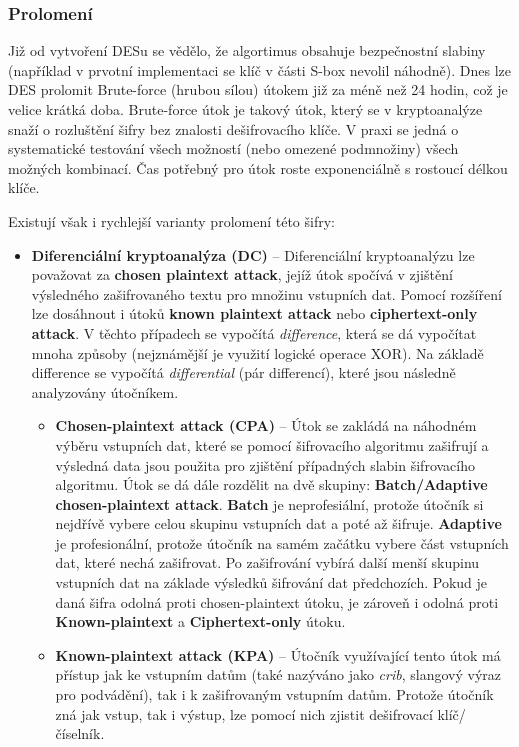 \documentclass[12pt, a4paper]{article}
\begin{document}
		\subsubsection{Prolomení}
		Již od vytvoření DESu se vědělo, že algortimus obsahuje bezpečnostní slabiny (například v prvotní implementaci se klíč v části S-box nevolil náhodně). Dnes lze DES prolomit Brute-force (hrubou sílou) útokem již za méně než 24 hodin, což je velice krátká doba. Brute-force útok je takový útok, který se v kryptoanalýze snaží o rozluštění šifry bez znalosti dešifrovacího klíče. V praxi se jedná o systematické testování všech možností (nebo omezené podmnožiny) všech možných kombinací. Čas potřebný pro útok roste exponenciálně s rostoucí délkou klíče.
		\par
		Existují však i rychlejší varianty prolomení této šifry:
		\begin{itemize}
			\item \textbf{Diferenciální kryptoanalýza (DC)} -- Diferenciální kryptoanalýzu lze považovat za \textbf{chosen plaintext attack}, jejíž útok spočívá v zjištění výsledného zašifrovaného textu pro množinu vstupních dat. Pomocí rozšíření lze dosáhnout i útoků \textbf{known plaintext attack} nebo \textbf{ciphertext-only attack}. V těchto případech se vypočítá \textit{difference}, která se dá vypočítat mnoha způsoby (nejznámější je využití logické operace XOR). Na základě difference se vypočítá \textit{differential} (pár differencí), které jsou následně analyzovány útočníkem.
			\begin{itemize}	
				\item \textbf{Chosen-plaintext attack (CPA)} -- Útok se zakládá na náhodném výběru vstupních dat, které se pomocí šifrovacího algoritmu zašifrují a výsledná data jsou použita pro zjištění případných slabin šifrovacího algoritmu. Útok se dá dále rozdělit na dvě skupiny: \textbf{Batch/Adaptive chosen-plaintext attack}. \textbf{Batch} je neprofesiální, protože útočník si nejdřívě vybere celou skupinu vstupních dat a poté až šifruje. \textbf{Adaptive} je profesionální, protože útočník na samém začátku vybere část vstupních dat, které nechá zašifrovat. Po zašifrování vybírá další menší skupinu vstupních dat na základe výsledků šifrování dat předchozích. Pokud je daná šifra odolná proti chosen-plaintext útoku, je zároveň i odolná proti \textbf{Known-plaintext} a \textbf{Ciphertext-only} útoku.
				\item \textbf{Known-plaintext attack (KPA)} -- Útočník využívající tento útok má přístup jak ke vstupním datům (také nazýváno jako \textit{crib}, slangový výraz pro podvádění), tak i k zašifrovaným vstupním datům. Protože útočník zná jak vstup, tak i výstup, lze pomocí nich zjistit dešifrovací klíč/číselník.

\end{itemize}
\end{itemize}
\end{document}
